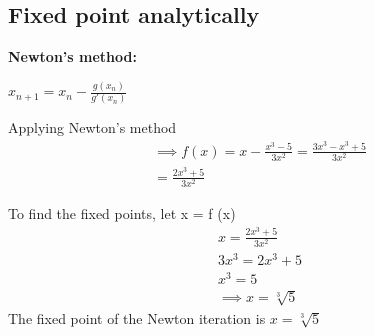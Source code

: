 \subsection{Fixed point analytically}
\label{Fixed point finding}
\textbf{Newton's method:}
\begin{centering}
    $x_{n+1} = x_{n} - \frac{g(x_{n})}{g'(x_{n})}$
\end{centering}

Applying Newton's method\\
\begin{align*}
\implies f(x) = x - \frac{x^{3} - 5}{3x^{2}} = \frac{3x^{3} - x^{3} + 5}{3x^{2}}\\
= \frac{2x^{3} + 5}{3x^{2}} 
\end{align*}

To find the fixed points, let x = f (x)\\
\begin{align*}
x = \frac{2x^{3} + 5}{3x^{2}} \\
3x^{3} = 2x^{3} + 5  \\
x^{3} = 5 \\
\implies x = \sqrt[3]{5}
\end{align*}
The fixed point of the Newton iteration is $x= \sqrt[3]{5}$ \\

\newpage
